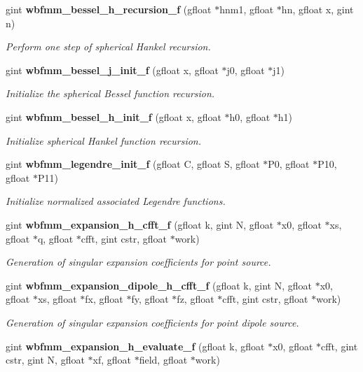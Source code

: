 \begin{DoxyCompactItemize}
gint {\bf wbfmm\+\_\+bessel\+\_\+h\+\_\+recursion\+\_\+f} (gfloat $\ast$hnm1, gfloat $\ast$hn, gfloat x, gint n)
\begin{DoxyCompactList}\small\item\em Perform one step of spherical Hankel recursion. \end{DoxyCompactList}\item 
gint {\bf wbfmm\+\_\+bessel\+\_\+j\+\_\+init\+\_\+f} (gfloat x, gfloat $\ast$j0, gfloat $\ast$j1)
\begin{DoxyCompactList}\small\item\em Initialize the spherical Bessel function recursion. \end{DoxyCompactList}\item 
gint {\bf wbfmm\+\_\+bessel\+\_\+h\+\_\+init\+\_\+f} (gfloat x, gfloat $\ast$h0, gfloat $\ast$h1)
\begin{DoxyCompactList}\small\item\em Initialize spherical Hankel function recursion. \end{DoxyCompactList}\item 
gint {\bf wbfmm\+\_\+legendre\+\_\+init\+\_\+f} (gfloat C, gfloat S, gfloat $\ast$P0, gfloat $\ast$P10, gfloat $\ast$P11)
\begin{DoxyCompactList}\small\item\em Initialize normalized associated Legendre functions. \end{DoxyCompactList}\item 
gint {\bf wbfmm\+\_\+expansion\+\_\+h\+\_\+cfft\+\_\+f} (gfloat k, gint N, gfloat $\ast$x0, gfloat $\ast$xs, gfloat $\ast$q, gfloat $\ast$cfft, gint cstr, gfloat $\ast$work)
\begin{DoxyCompactList}\small\item\em Generation of singular expansion coefficients for point source. \end{DoxyCompactList}\item 
gint {\bf wbfmm\+\_\+expansion\+\_\+dipole\+\_\+h\+\_\+cfft\+\_\+f} (gfloat k, gint N, gfloat $\ast$x0, gfloat $\ast$xs, gfloat $\ast$fx, gfloat $\ast$fy, gfloat $\ast$fz, gfloat $\ast$cfft, gint cstr, gfloat $\ast$work)
\begin{DoxyCompactList}\small\item\em Generation of singular expansion coefficients for point dipole source. \end{DoxyCompactList}\item 
gint {\bf wbfmm\+\_\+expansion\+\_\+h\+\_\+evaluate\+\_\+f} (gfloat k, gfloat $\ast$x0, gfloat $\ast$cfft, gint cstr, gint N, gfloat $\ast$xf, gfloat $\ast$field, gfloat $\ast$work)

\end{DoxyCompactItemize}
